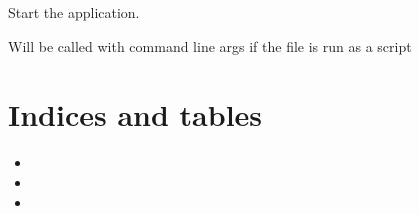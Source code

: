 \documentclass[letterpaper,10pt,english]{sphinxmanual}
\begin{document}

\begin{fulllineitems}
\label{\detokenize{main:main.main}}
Start the application.

Will be called with command line args if the file is run as a script

\end{fulllineitems}



\chapter{Indices and tables}
\label{\detokenize{index:indices-and-tables}}\begin{itemize}
\item {} 

\item {} 

\item {} 

\end{itemize}
\end{document}
